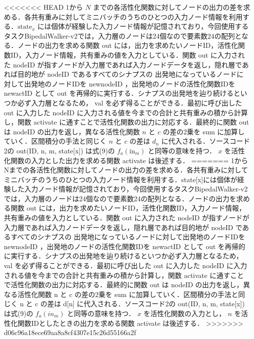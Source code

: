 <<<<<<< HEAD
1から $ N $ までの各活性化関数に対してノードの出力の差を求める．各共有重みに対してミニバッチのうちのひとつの入力ノード情報を利用する．$ \text{state}_x $ には個体が経験した入力ノード情報が記憶されており，今回使用するタスクBipedalWalker-v2では，入力層のノードは24個なので要素数24の配列となる\cite{OpenAI}．ノードの出力を求める関数 out には，出力を求めたいノードID，活性化関数ID，入力ノード情報，共有重みの値を入力としている．関数 out に入力された nodeID が指すノードが入力層であれば入力ノードデータを返し，隠れ層であれば目的地が nodeID であるすべてのシナプスの 出発地になっているノードに対して出発地のノードIDを newnodeID ，出発地のノードの活性化関数IDを newactID として out を再帰的に実行する．シナプスの出発地を辿り続けるといつか必ず入力層となるため， val を必ず得ることができる．最初に呼び出した out に入力した nodeID に入力される値を今までの合計と共有重みの積から計算し，関数 activate に通すことで活性化関数の出力に対応する．最終的に関数 out は nodeID の出力を返し，異なる活性化関数 $ n $ と $ c $ の差の2乗を sum に加算していく．区間積分の手法と同じく $ n $ と $ c $ の差は $ d_n $ に代入される．ソースコード2の out(ID, n, m, state[x]) は式(9)の $ f_{a}(\text{in}_{m}) $ と同等の意味を持つ． $ x $ を活性化関数の入力とした出力を求める関数 activate は後述する．
=======
1からNまでの各活性化関数に対してノードの出力の差を求める．各共有重みに対してミニバッチのうちのひとつの入力ノード情報を利用する．state[x]には個体が経験した入力ノード情報が記憶されており，今回使用するタスクBipedalWalker-v2\cite{OpenAI}では，入力層のノードは24個なので要素数24の配列となる．ノードの出力を求める関数 out には，出力を求めたいノードID，活性化関数ID，入力ノード情報，共有重みの値を入力としている．関数 out に入力された nodeID が指すノードが入力層であれば入力ノードデータを返し，隠れ層であれば目的地が nodeID であるすべてのシナプスの 出発地になっているノードに対して出発地のノードIDを newnodeID ，出発地のノードの活性化関数IDを newactID として out を再帰的に実行する．シナプスの出発地を辿り続けるといつか必ず入力層となるため， val を必ず得ることができる．最初に呼び出した out に入力した nodeID に入力される値を今までの合計と共有重みの積から計算し，関数 activate に通すことで活性化関数の出力に対応する．最終的に関数 out は nodeID の出力を返し，異なる活性化関数 n と c の差の2乗を sum に加算していく．区間積分の手法と同じく n と c の差は d[n] に代入される．ソースコード2の out(ID, n, m, state[x]) は式(9)の $ f_{a}(in_{m}) $ と同等の意味を持つ． $ x $ を活性化関数の入力とし， $ n $ を活性化関数IDとしたときの出力を求める関数 activate は後述する．
>>>>>>> d06c96a18ece69aa8a8cf4307e15c26d55166a2f

